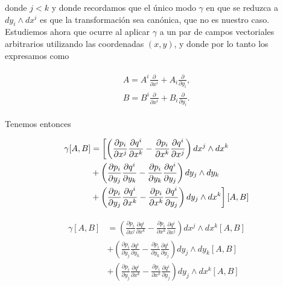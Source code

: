 \documentclass[a4paper,10pt]{article}
\numberwithin{equation}{section}
\newcommand{\zerodel}{.\kern-\nulldelimiterspace}
\begin{document}
donde $j < k$ y donde recordamos que el único modo $\gamma$ en que se reduzca 
a $dy_i \wedge dx^i$ es que la transformación sea canónica, que no es nuestro caso. Estudiemos 
ahora que ocurre al aplicar $\gamma$ a un par de campos vectoriales arbitrarios utilizando 
las coordenadas $(x,y)$, y donde por lo tanto los expresamos como 

\begin{align}
 \begin{split}
  A = A^i\frac{\partial}{\partial x^i} + A_i \frac{\partial}{\partial y_i}, \\
  B = B^i\frac{\partial}{\partial x^i} + B_i \frac{\partial}{\partial y_i}.
 \end{split}
\end{align}

Tenemos entonces 

\begin{align}
\begin{split}
 \gamma[A,B] &= \left[\left(\frac{\partial p_i}{\partial x^j}\frac{\partial q^i}{\partial x^k} 
 - \frac{\partial p_i}{\partial x^k}\frac{\partial q^i}{\partial x^j}\right)dx^j \wedge dx^k\right\zerodel \\
 &+ \left(\frac{\partial p_i}{\partial y_j}\frac{\partial q^i}{\partial y_k} 
 - \frac{\partial p_i}{\partial y_k}\frac{\partial q^i}{\partial y_j}\right)dy_j \wedge dy_k \\
 &+ \left\zerodel\left(\frac{\partial p_i}{\partial y_j}\frac{\partial q^i}{\partial x^k} 
 - \frac{\partial p_i}{\partial x^k}\frac{\partial q^i}{\partial y_j}\right)dy_j \wedge dx^k\right]
 [A,B]
\end{split}
\end{align}

\begin{align}
\begin{split}
 \gamma[A,B] &= \left(\frac{\partial p_i}{\partial x^j}\frac{\partial q^i}{\partial x^k} 
 - \frac{\partial p_i}{\partial x^k}\frac{\partial q^i}{\partial x^j}\right)dx^j \wedge dx^k[A,B] \\
 &+ \left(\frac{\partial p_i}{\partial y_j}\frac{\partial q^i}{\partial y_k} 
 - \frac{\partial p_i}{\partial y_k}\frac{\partial q^i}{\partial y_j}\right)dy_j \wedge dy_k[A,B] \\
 &+ \left(\frac{\partial p_i}{\partial y_j}\frac{\partial q^i}{\partial x^k} 
 - \frac{\partial p_i}{\partial x^k}\frac{\partial q^i}{\partial y_j}\right)dy_j \wedge dx^k[A,B]
\end{split}
\end{align}
\end{document}
